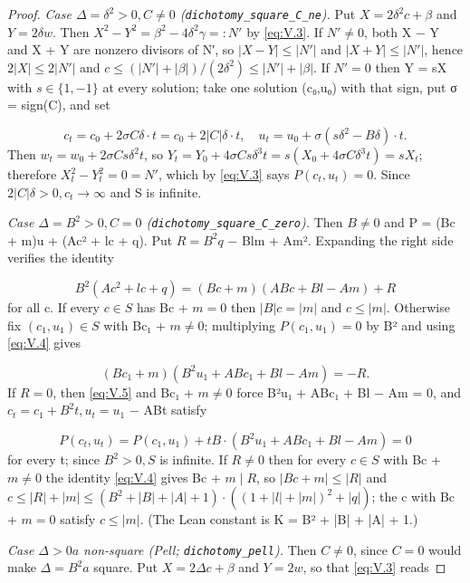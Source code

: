 \begin{proof}
\emph{Case $Δ = δ^{2} > 0, C ≠ 0$ (\texttt{dichotomy\_\allowbreak{}square\_\allowbreak{}C\_\allowbreak{}ne}).} Put $X = 2δ^{2}c + β$ and $Y = 2δw$. Then $X^{2} − Y^{2} = β^{2} − 4δ^{2}γ =: N′$ by \eqref{eq:V.3}. If $N′ ≠ 0$, both X − Y and X + Y are nonzero divisors of N′, so $|X − Y| ≤ |N′|$ and $|X + Y| ≤ |N′|$, hence $2|X| ≤ 2|N′|$ and $c ≤ (|N′| + |β|)/(2δ^{2}) ≤ |N′| + |β|$. If $N′ = 0$ then Y = sX with $s ∈ \{1, −1\}$ at every solution; take one solution (c₀,u₀) with that sign, put σ = sign(C), and set

\[
c_{t} = c_{0} + 2σCδ·t = c_{0} + 2|C|δ·t, \quad u_{t} = u_{0} + σ(sδ^{2} − Bδ)·t.
\]
Then $w_{t} = w_{0} + 2σCsδ^{2}t$, so $Y_{t} = Y_{0} + 4σCsδ^{3}t = s(X_{0} + 4σCδ^{3}t) = sX_{t}$; therefore $X_{t}^{2} − Y_{t}^{2} = 0 = N′$, which by \eqref{eq:V.3} says $P(c_{t},u_{t}) = 0$. Since $2|C|δ > 0, c_{t} → ∞$ and S is infinite.

\emph{Case $Δ = B^{2} > 0, C = 0$ (\texttt{dichotomy\_\allowbreak{}square\_\allowbreak{}C\_\allowbreak{}zero}).} Then $B ≠ 0$ and P = (Bc + m)u + (Ac² + lc + q). Put $R = B^{2}q$ − Blm + Am². Expanding the right side verifies the identity

\begin{equation}\tag{V.4}\label{eq:V.4}
B^{2}(Ac^{2} + lc + q) = (Bc + m)(ABc + Bl − Am) + R
\end{equation}
for all c. If every $c ∈ S$ has Bc + $m = 0$ then $|B|c = |m|$ and $c ≤ |m|$. Otherwise fix $(c_{1},u_{1}) ∈ S$ with Bc₁ + $m ≠ 0$; multiplying $P(c_{1},u_{1}) = 0$ by B² and using \eqref{eq:V.4} gives

\begin{equation}\tag{V.5}\label{eq:V.5}
(Bc_{1} + m)(B^{2}u_{1} + ABc_{1} + Bl − Am) = −R.
\end{equation}
If $R = 0$, then \eqref{eq:V.5} and Bc₁ + $m ≠ 0$ force B²u₁ + ABc₁ + Bl − Am = 0, and $c_{t} = c_{1} + B^{2}t, u_{t} = u_{1}$ − ABt satisfy

\[
P(c_{t},u_{t}) = P(c_{1},u_{1}) + tB·(B^{2}u_{1} + ABc_{1} + Bl − Am) = 0
\]
for every t; since $B^{2} > 0, S$ is infinite. If $R ≠ 0$ then for every $c ∈ S$ with Bc + $m ≠ 0$ the identity \eqref{eq:V.4} gives Bc + $m ∣ R$, so $|Bc + m| ≤ |R|$ and $c ≤ |R| + |m| ≤ (B^{2} + |B| + |A| + 1)·((1 + |l| + |m|)^{2} + |q|)$; the c with Bc + $m = 0$ satisfy $c ≤ |m|$. (The Lean constant is K = B² + |B| + |A| + 1.)

\emph{Case $Δ > 0 a$ non-square (Pell; \texttt{dichotomy\_\allowbreak{}pell}).} Then $C ≠ 0$, since $C = 0$ would make $Δ = B^{2} a$ square. Put $X = 2Δc + β$ and $Y = 2w$, so that \eqref{eq:V.3} reads


\end{proof}
